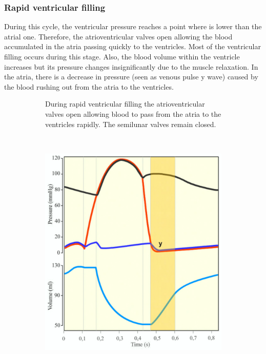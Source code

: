\subsubsection{Rapid ventricular filling}
During this cycle, the ventricular pressure reaches a point where is lower than the atrial one. Therefore, the atrioventricular valves open allowing the blood accumulated in the atria passing quickly to the ventricles. Most of the ventricular filling occurs during this stage. Also, the blood volume within the ventricle increases but its pressure changes insignificantly due to the muscle relaxation. In the atria, there is a decrease in pressure (seen as venous pulse y wave) caused by the blood rushing out from the atria to the ventricles. 
\begin{figure}[!htpb]
	\begin{subfigure}[t]{0.48\textwidth}
		\centering
		\caption{During rapid ventricular filling the atrioventricular valves open allowing blood to pass from the atria to the ventricles rapidly. The semilunar valves remain closed.}
		\label{fig:heart rapid ventricular filling}
	\end{subfigure}
	~
	\begin{subfigure}[t]{0.48\textwidth}
		\centering
		\includegraphics[width=\textwidth,keepaspectratio]{figure_13}

\end{subfigure}
\end{figure}
